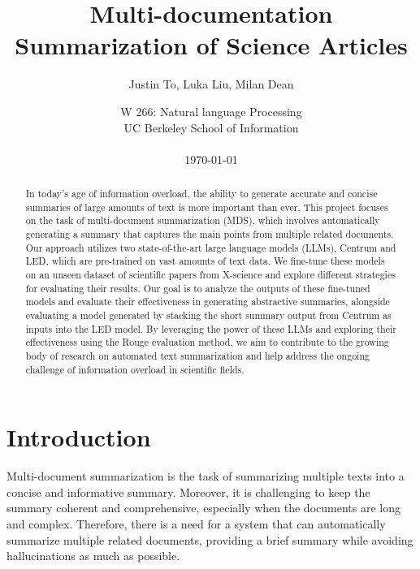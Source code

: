 \documentclass[12pt, twocolumn]{article}
\numberwithin{equation}{section}
\begin{document}
\sloppy %

\title{Multi-documentation Summarization of Science Articles}
\author{Justin To, Luka Liu, Milan Dean}
\date{
    W 266: Natural language Processing
    \\UC Berkeley School of Information
    \\~
    \\\today
}
\maketitle

\begin{abstract}%

In today's age of information overload, the ability to generate accurate and concise summaries of large amounts of text is more important than ever. This project focuses on the task of multi-document summarization (MDS), which involves automatically generating a summary that captures the main points from multiple related documents. Our approach utilizes two state-of-the-art large language models (LLMs), Centrum and LED, which are pre-trained on vast amounts of text data. We fine-tune these models on an unseen dataset of scientific papers from X-science and explore different strategies for evaluating their results. Our goal is to analyze the outputs of these fine-tuned models and evaluate their effectiveness in generating abstractive summaries, alongside evaluating a model generated by stacking the short summary output from Centrum as inputs into the LED model. By leveraging the power of these LLMs and exploring their effectiveness using the Rouge evaluation method, we aim to contribute to the growing body of research on automated text summarization and help address the ongoing challenge of information overload in scientific fields.

\end{abstract}

\section{Introduction}

Multi-document summarization is the task of summarizing multiple texts into a concise and informative summary. Moreover, it is challenging to keep the summary coherent and comprehensive, especially when the documents are long and complex. Therefore, there is a need for a system that can automatically summarize multiple related documents, providing a brief summary while avoiding hallucinations as much as possible.
\end{document}
